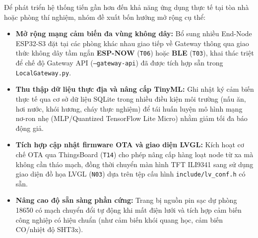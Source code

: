 Để phát triển hệ thống tiến gần hơn đến khả năng ứng dụng thực tế tại tòa nhà hoặc phòng thí nghiệm, nhóm đề xuất bốn hướng mở rộng cụ thể:
\begin{itemize}[leftmargin=*, itemsep=3pt]
  \item \textbf{Mở rộng mạng cảm biến đa vùng không dây:} Bổ sung nhiều End-Node ESP32-S3 đặt tại các phòng khác nhau giao tiếp về Gateway thông qua giao thức không dây tầm ngắn \textbf{ESP-NOW} (\texttt{T06}) hoặc \textbf{BLE} (\texttt{T03}), khai thác triệt để chế độ Gateway API (\texttt{--gateway-api}) đã được tích hợp sẵn trong \texttt{LocalGateway.py}.
  \item \textbf{Thu thập dữ liệu thực địa và nâng cấp TinyML:} Ghi nhật ký cảm biến thực tế qua cơ sở dữ liệu SQLite trong nhiều điều kiện môi trường (nấu ăn, hơi nước, khói hương, cháy thực nghiệm) để tái huấn luyện mô hình mạng nơ-ron nhẹ (MLP/Quantized TensorFlow Lite Micro) nhằm giảm tối đa báo động giả.
  \item \textbf{Tích hợp cập nhật firmware OTA và giao diện LVGL:} Kích hoạt cơ chế OTA qua ThingsBoard (\texttt{T14}) cho phép nâng cấp hàng loạt node từ xa mà không cần tháo mạch, đồng thời chuyển màn hình TFT ILI9341 sang sử dụng giao diện đồ họa LVGL (\texttt{N03}) dựa trên tệp cấu hình \texttt{include/lv\_conf.h} có sẵn.
  \item \textbf{Nâng cao độ sẵn sàng phần cứng:} Trang bị nguồn pin sạc dự phòng 18650 có mạch chuyển đổi tự động khi mất điện lưới và tích hợp cảm biến công nghiệp có hiệu chuẩn (như cảm biến khói quang học, cảm biến CO/nhiệt độ SHT3x).
\end{itemize}

